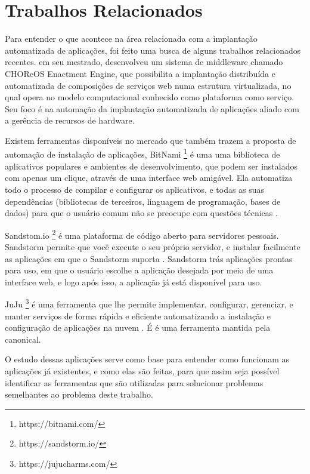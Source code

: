 \section{Trabalhos Relacionados}
\label{section:trabalhos_relacionados}

Para entender o que acontece na área relacionada com a implantação
automatizada de aplicações, foi feito uma busca de alguns trabalhos relacionados 
recentes.  em seu mestrado,
desenvolveu um sistema de middleware chamado CHOReOS Enactment Engine, que possibilita a implantação distribuída e automatizada de composições
de serviços web numa estrutura virtualizada, no qual opera no modelo
computacional conhecido como plataforma como serviço. Seu foco é na automação da 
implantação automatizada de aplicações aliado com a gerência de recursos de 
hardware.

Existem ferramentas disponíveis no mercado que também trazem a proposta
de automação de instalação de aplicações, BitNami \footnote{https://bitnami.com/} é uma 
uma biblioteca de aplicativos populares e ambientes de desenvolvimento, 
que podem ser instalados com apenas um clique, 
através de uma interface web amigável. Ela automatiza todo o processo de 
compilar e configurar os aplicativos, 
e todas as suas dependências (bibliotecas de terceiros, linguagem de programação, 
bases de dados) para que o usuário comum não se preocupe com questões técnicas . 

Sandstom.io \footnote{https://sandstorm.io/} é uma plataforma de código aberto para servidores
pessoais. Sandstorm permite que você execute o seu próprio servidor, e instalar
facilmente as aplicações em que o Sandstorm 
suporta . Sandstorm trás aplicações prontas para uso, 
em que o usuário escolhe a aplicação desejada  por meio de uma interface web, 
e logo após isso, a aplicação já está disponível para uso.

JuJu \footnote{https://jujucharms.com/} é uma ferramenta que lhe permite 
implementar, configurar, gerenciar, 
e manter serviços de forma rápida e eficiente automatizando a instalação e 
configuração de aplicações na nuvem \cite{juju}. É 
é uma ferramenta mantida pela canonical. 

O estudo dessas aplicações serve como base para entender como funcionam as aplicações
já existentes, e como elas são feitas, para que assim seja possível identificar
as ferramentas que são utilizadas para solucionar problemas semelhantes ao problema deste
trabalho. 

